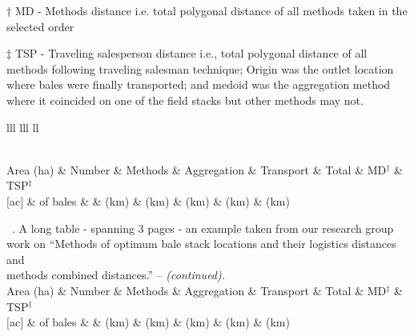 \documentclass[phd,showgrids]{ndsu-thesis-2022}
\newcommand\tabletopinfo{
\toprule
Area (ha) & Number  & Methods & Aggregation & Transport & Total & MD$^\dag$ & TSP$^\ddag$ \\
$[$ac$]$ & of bales  &  & (km) & (km) & (km) & (km) & (km) \\
    \midrule 
}
\begin{document}
{\small 
{\renewcommand{\arraystretch}{0.6}
\begin{ThreePartTable}
  \begin{TableNotes}
  \baselineskip
    \item[] $\dag$ MD - Methods distance i.e. total polygonal distance of all methods taken in the selected order    
    \item[] $\ddag$ TSP - Traveling salesperson distance i.e., total polygonal distance of all methods following traveling salesman technique; Origin was the outlet location where bales were finally transported; and medoid was the aggregation method where it coincided on one of the field stacks but other methods may not.
  \end{TableNotes}
  \begin{longtable}{lll lll ll}
  \caption{\normalsize A long table - spanning 3 pages - an example taken from our research group work on ``Methods of optimum bale stack locations and their logistics distances and methods combined distances.''}\label{tab1}\\[-2ex]     
  \tabletopinfo%
    \endfirsthead
    
{{\normalsize\tablename\ \thetable{}.  A long table - spanning 3 pages - an example taken from our research group}} \\ 
{{\normalsize work on ``Methods of optimum bale stack locations and their logistics distances and }} \\
{{\normalsize methods combined distances.'' -- \emph{(continued).}}} \\[2ex] 
 \tabletopinfo
    \endhead
    
    \endfoot
    \bottomrule
    \insertTableNotes
    \endlastfoot
        

\end{longtable}
\end{ThreePartTable}}}
\end{document}
